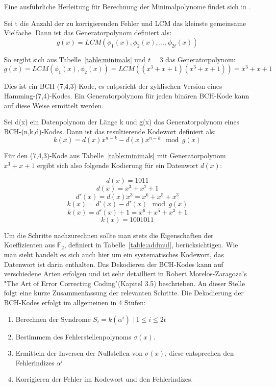 Eine ausführliche Herleitung für Berechnung der Minimalpolynome findet sich in \cite[Kap. 3.2.1]{morelos2006art}.

\begin{t_def}
Sei t die Anzahl der zu korrigierenden Fehler und LCM das kleinste gemeinsame Vielfache. Dann ist das Generatorpolynom definiert als:
$$g(x) = LCM(\phi_1(x),\phi_2(x),...,\phi_{2t}(x))$$
\end{t_def}

So ergibt sich aus Tabelle~\ref{table:minimals} und $t=3$ das Generatorpolynom:
$$g(x) = LCM(\phi_1(x),\phi_2(x)) = LCM((x^3+x+1)(x^3+x+1)) = x^3+x+1$$

Dies ist ein BCH-(7,4,3)-Kode, es entpsricht der zyklischen Version eines Hamming-(7,4)-Kodes. Ein Generatorpolynom für jeden binären BCH-Kode kann auf diese Weise ermittelt werden.

\begin{t_def}
Sei d(x) ein Datenpolynom der Länge k und g(x) das Generatorpolynom eines BCH-(n,k,d)-Kodes. Dann ist das resultierende Kodewort definiert als:
$$k(x) = d(x)x^{n-k} - d(x)x^{n-k} \mod g(x)$$
\end{t_def}

Für den (7,4,3)-Kode aus Tabelle~\ref{table:minimals} mit Generatorpolynom $x^3+x+1$ ergibt sich also folgende Kodierung für ein Datenwort $d(x)$:

$$d(x) = 1011$$
$$d(x) = x^3 + x^2 + 1$$
$$d'(x) = d(x)x^3 = x^6 + x^5 + x^3$$
$$k(x) = d'(x) - d'(x) \mod g(x)$$
$$k(x) = d'(x) + 1 = x^6 + x^5 + x^3 + 1$$
$$k(x) = 1001011$$

Um die Schritte nachzurechnen sollte man stets die Eigenschaften der Koeffizienten aus $\mathbb{F}_2$, definiert in Tabelle~\ref{table:addmul}, berücksichtigen.
Wie man sieht handelt es sich auch hier um ein systematisches Kodewort, das Datenwort ist darin enthalten.
\newblock
\newline
Das Dekodieren der BCH-Kodes kann auf verschiedene Arten erfolgen und ist sehr detailliert in Robert Morelos-Zaragoza's "The Art of Error Correcting Coding"(Kapitel 3.5) beschrieben.\cite{morelos2006art}
An dieser Stelle folgt eine kurze Zusammenfassung der relevanten Schritte.
Die Dekodierung der BCH-Kodes erfolgt im allgemeinen in 4 Stufen:

\begin{enumerate}
\item Berechnen der Syndrome $S_i = k(\alpha^i) \mid 1 \leq i \leq 2t$
\item Bestimmem des Fehlerstellenpolynoms $\sigma(x)$.
\item Ermitteln der Inversen der Nullstellen von $\sigma(x)$, diese entsprechen den Fehlerindizes $\alpha^i$
\item Korrigieren der Fehler im Kodewort und den Fehlerindizes.
\end{enumerate}

